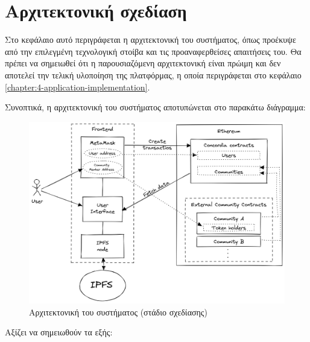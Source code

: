 \section{Αρχιτεκτονική σχεδίαση} \label{section:3-7-architecture-design}

Στο κεφάλαιο αυτό περιγράφεται η αρχιτεκτονική του συστήματος, όπως προέκυψε από την επιλεγμένη τεχνολογική στοίβα και τις προαναφερθείσες απαιτήσεις του. Θα πρέπει να σημειωθεί ότι η παρουσιαζόμενη αρχιτεκτονική είναι πρώιμη και δεν αποτελεί την τελική υλοποίηση της πλατφόρμας, η οποία περιγράφεται στο κεφάλαιο \ref{chapter:4-application-implementation}. 

Συνοπτικά, η αρχιτεκτονική του συστήματος αποτυπώνεται στο παρακάτω διάγραμμα:

\begin{figure}[H]
    \centering
    \includegraphics[width=.75\textwidth]{assets/figures/chapter-3/3.7.architecture-design}
    \caption{Αρχιτεκτονική του συστήματος (στάδιο σχεδίασης)}
\end{figure}

Αξίζει να σημειωθούν τα εξής:

